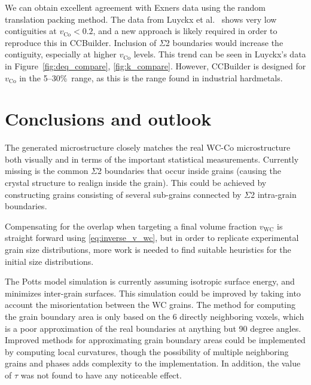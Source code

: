 \documentclass[3p,12pt]{elsarticle}
\newcommand{\Co}{\mathrm{Co}}
\newcommand{\WC}{\mathrm{WC}}
\begin{document}
We can obtain excellent agreement with Exners data \cite{exner_physical_1979} using the random translation packing method.
The data from Luyckx et al.\ \cite{luyckx_dependence_2006} shows very low contiguities at $v_\Co < 0.2$, and a new approach is likely required in order to reproduce this in CCBuilder.
%
%
Inclusion of $\Sigma$2 boundaries would increase the contiguity, especially at higher $v_\Co$ levels.
This trend can be seen in Luyckx's data in Figure~\ref{fig:deq_compare}, \ref{fig:k_compare}.
However, CCBuilder is designed for $v_\Co$ in the 5--30\%\ range, as this is the range found in industrial hardmetals.


\section{Conclusions and outlook}

The generated microstructure closely matches the real WC-Co microstructure both visually and in terms of the important statistical measurements.
Currently missing is the common $\Sigma$2 boundaries that occur inside grains (causing the crystal structure to realign inside the grain).
This could be achieved by constructing grains consisting of several sub-grains connected by $\Sigma$2 intra-grain boundaries.

Compensating for the overlap when targeting a final volume fraction $v_\WC$ is straight forward using \eqref{eq:inverse_v_wc}, but in order to replicate experimental grain size distributions, more work is needed to find suitable heuristics for the initial size distributions.


The Potts model simulation is currently assuming isotropic surface energy, and minimizes inter-grain surfaces.
This simulation could be improved by taking into account the misorientation between the WC grains.
The method for computing the grain boundary area is only based on the 6 directly neighboring voxels, which is a poor approximation of the real boundaries at anything but 90 degree angles.
Improved methods for approximating grain boundary areas could be implemented by computing local curvatures, though the possibility of multiple neighboring grains and phases adds complexity to the implementation.
In addition, the value of $\tau$ was not found to have any noticeable effect.
\end{document}
